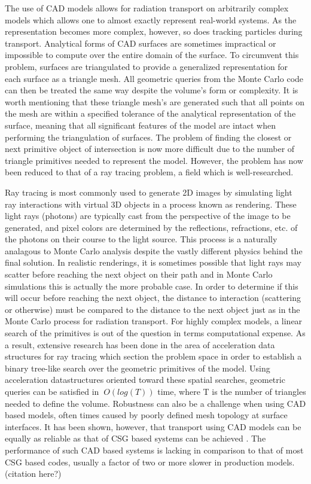 \documentclass[12pt, a4paper]{article}
\begin{document}
The use of CAD models allows for radiation transport on arbitrarily complex models which allows one to almost exactly represent real-world systems. As the representation becomes more complex, however, so does tracking particles during transport. Analytical forms of CAD surfaces are sometimes impractical or impossible to compute over the entire domain of the surface. To circumvent this problem, surfaces are triangulated to provide a generalized representation for each surface as a triangle mesh. All geometric queries from the Monte Carlo code can then be treated the same way despite the volume's form or complexity. It is worth mentioning that these triangle mesh's are generated such that all points on the mesh are within a specified tolerance of the analytical representation of the surface, meaning that all significant features of the model are intact when performing the triangulation of surfaces. The problem of finding the closest or next primitive object of intersection is now more difficult due to the number of triangle primitives needed to represent the model. However, the problem has now been reduced to that of a ray tracing problem, a field which is well-researched.

Ray tracing is most commonly used to generate 2D images by simulating light ray interactions with virtual 3D objects in a process known as rendering. These light rays (photons) are typically cast from the perspective of the image to be generated, and pixel colors are determined by the reflections, refractions, etc. of the photons on their course to the light source. This process is a naturally analagous to Monte Carlo analysis despite the vastly different physics behind the final solution. In realistic renderings, it is sometimes possible that light rays may scatter before reaching the next object on their path and in Monte Carlo simulations this is actually the more probable case. In order to determine if this will occur before reaching the next object, the distance to interaction (scattering or otherwise) must be compared to the distance to the next object just as in the Monte Carlo process for radiation transport. For highly complex models, a linear search of the primitives is out of the question in terms computational expense. As a result, extensive research has been done in the area of acceleration data structures for ray tracing which section the problem space in order to establish a binary tree-like search over the geometric primitives of the model. Using acceleration datastructures oriented toward these spatial searches, geometric queries can be satisfied in $~O(log(T))$ time, where T is the number of triangles needed to define the volume. Robustness can also be a challenge when using CAD based models, often times caused by poorly defined mesh topology at surface interfaces. It has been shown, however, that transport using CAD models can be equally as reliable as that of CSG based systems can be achieved \cite{smith_thesis_2011}. The performance of such CAD based systems is lacking in comparison to that of most CSG based codes, usually a factor of two or more slower in production models. (citation here?)
\end{document}
